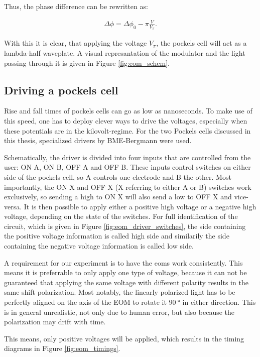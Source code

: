 Thus, the phase difference can be rewritten as:

\begin{align}
	\label{eq:eom_phase_diff}
	\Delta \phi = \Delta \phi_0 - \pi \frac{V}{V_\pi} .
\end{align}

With this it is clear, that applying the voltage $V_\pi$, the pockels cell will act as a lambda-half waveplate. A visual represantation of the modulator and the light passing through it is given in Figure \ref{fig:eom_schem}.

\subsection{Driving a pockels cell}

Rise and fall times of pockels cells can go as low as nanoseconds. To make use of this speed, one has to deploy clever ways to drive the voltages, especially when these potentials are in the kilovolt-regime. For the two Pockels cells discussed in this thesis, specialized drivers by BME-Bergmann  were used.

Schematically, the driver is divided into four inputs that are controlled from the user: ON A, ON B, OFF A and OFF B. These inputs control switches on either side of the pockels cell, so A controls one electrode and B the other. Most importantly, the ON X and OFF X (X referring to either A or B) switches work exclusively, so sending a high to ON X will also send a low to OFF X and vice-versa. It is then possible to apply either a positive high voltage or a negative high voltage, depending on the state of the switches. For full identification of the circuit, which is given in Figure \ref{fig:eom_driver_switches}, the side containing the positive voltage information is called high side and similarily the side containing the negative voltage information is called low side.

A requirement for our experiment is to have the \acp{eom} work consistently. This means it is preferrable to only apply one type of voltage, because it can not be guaranteed that applying the same voltage with different polarity results in the same shift polarization. Most notably, the linearly polarized light has to be perfectly aligned on the axis of the EOM to rotate it $\SI{90}{\degree}$ in either direction. This is in general unrealistic, not only due to human error, but also because the polarization may drift with time.

This means, only positive voltages will be applied, which results in the timing diagrams in Figure \ref{fig:eom_timings}.

